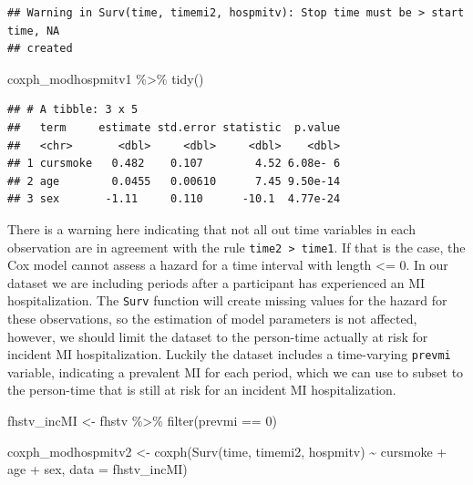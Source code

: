 \documentclass[
]{book}
\newenvironment{Shaded}{\begin{snugshade}}{\end{snugshade}}
\newcommand{\AttributeTok}[1]{\textcolor[rgb]{0.77,0.63,0.00}{#1}}
\newcommand{\DecValTok}[1]{\textcolor[rgb]{0.00,0.00,0.81}{#1}}
\newcommand{\FunctionTok}[1]{\textcolor[rgb]{0.00,0.00,0.00}{#1}}
\newcommand{\NormalTok}[1]{#1}
\newcommand{\OtherTok}[1]{\textcolor[rgb]{0.56,0.35,0.01}{#1}}
\newcommand{\SpecialCharTok}[1]{\textcolor[rgb]{0.00,0.00,0.00}{#1}}
\begin{document}
\begin{verbatim}
## Warning in Surv(time, timemi2, hospmitv): Stop time must be > start time, NA
## created
\end{verbatim}

\begin{Shaded}
\begin{Highlighting}[]
\NormalTok{coxph\_modhospmitv1 }\SpecialCharTok{\%\textgreater{}\%}
  \FunctionTok{tidy}\NormalTok{()}
\end{Highlighting}
\end{Shaded}

\begin{verbatim}
## # A tibble: 3 x 5
##   term     estimate std.error statistic  p.value
##   <chr>       <dbl>     <dbl>     <dbl>    <dbl>
## 1 cursmoke   0.482    0.107        4.52 6.08e- 6
## 2 age        0.0455   0.00610      7.45 9.50e-14
## 3 sex       -1.11     0.110      -10.1  4.77e-24
\end{verbatim}

There is a warning here indicating that not all out time variables in each observation are in agreement with the rule \texttt{time2\ \textgreater{}\ time1}. If that is the case, the Cox model cannot assess a hazard for a time interval with length \textless= 0. In our dataset we are including periods after a participant has experienced an MI hospitalization. The \texttt{Surv} function will create missing values for the hazard for these observations, so the estimation of model parameters is not affected, however, we should limit the dataset to the person-time actually at risk for incident MI hospitalization. Luckily the dataset includes a time-varying \texttt{prevmi} variable, indicating a prevalent MI for each period, which we can use to subset to the person-time that is still at risk for an incident MI hospitalization.

\begin{Shaded}
\begin{Highlighting}[]
\NormalTok{fhstv\_incMI }\OtherTok{\textless{}{-}}\NormalTok{ fhstv }\SpecialCharTok{\%\textgreater{}\%}
  \FunctionTok{filter}\NormalTok{(prevmi }\SpecialCharTok{==} \DecValTok{0}\NormalTok{) }

\NormalTok{coxph\_modhospmitv2 }\OtherTok{\textless{}{-}} \FunctionTok{coxph}\NormalTok{(}\FunctionTok{Surv}\NormalTok{(time, timemi2, hospmitv) }\SpecialCharTok{\textasciitilde{}} 
\NormalTok{                              cursmoke }\SpecialCharTok{+}\NormalTok{ age }\SpecialCharTok{+}\NormalTok{ sex, }\AttributeTok{data =}\NormalTok{ fhstv\_incMI)}
\end{Highlighting}
\end{Shaded}
\end{document}
